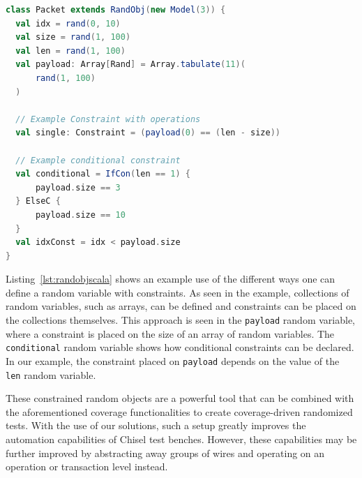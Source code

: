 \documentclass[conference]{IEEEtran}
\begin{document}
\begin{lstlisting}[language=scala, caption={Example usage of a random object. \texttt{rand(min, max, type=Normal)} declares a random variable. Any operation on a random variable generates a constraint.}, label={lst:randobjscala}]    
class Packet extends RandObj(new Model(3)) {
  val idx = rand(0, 10)
  val size = rand(1, 100)
  val len = rand(1, 100)
  val payload: Array[Rand] = Array.tabulate(11)(
 	  rand(1, 100)
  )

  // Example Constraint with operations
  val single: Constraint = (payload(0) == (len - size))

  // Example conditional constraint
  val conditional = IfCon(len == 1) {
      payload.size == 3
  } ElseC {
      payload.size == 10
  }
  val idxConst = idx < payload.size
}
\end{lstlisting}

Listing~\ref{lst:randobjscala} shows an example use of the different ways one can define a random variable with constraints.
As seen in the example, collections of random variables, such as arrays, can be defined and constraints can be placed on the collections themselves.
This approach is seen in the \texttt{payload} random variable, where a constraint is placed on the size of an array of random variables.
The \texttt{conditional} random variable shows how conditional constraints can be declared.
In our example, the constraint placed on \texttt{payload} depends on the value of the \texttt{len} random variable. 

These constrained random objects are a powerful tool that can be combined with the aforementioned coverage functionalities to create coverage-driven randomized tests.
With the use of our solutions, such a setup greatly improves the automation capabilities of Chisel test benches.
However, these capabilities may be further improved by abstracting away groups of wires and operating on an operation or transaction level instead.


\end{document}
